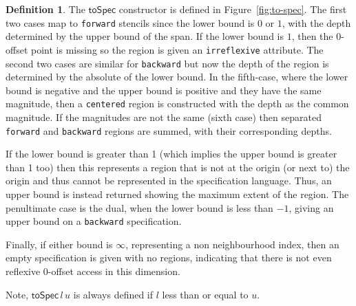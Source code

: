 \documentclass[9pt]{sigplanconf}
\newcounter{block}
\theoremstyle{definition}
\newtheorem{definition}[block]{Definition}
\begin{document}
\begin{definition} The $\mathsf{toSpec}$ constructor is defined
in Figure~\ref{fig:to-spec}.
The first two cases map to \texttt{forward} stencils since the lower
bound is $0$ or $1$, with the depth determined by the upper bound of
the span. If the lower bound is $1$, then the
$0$-offset point is missing so the region is given an
\texttt{irreflexive} attribute. The second two cases are similar for
\texttt{backward} but now the depth of the region is determined by the
absolute of the lower bound. In the fifth-case, where the lower bound
is negative and the upper bound is positive and they have the same
magnitude, then a \texttt{centered} region is constructed with
the depth as the common magnitude. If the magnitudes are not the same
(sixth case) then separated \texttt{forward} and \texttt{backward}
regions are summed, with their corresponding depths.

If the lower bound is greater than 1
(which implies the upper bound is greater than 1 too) then
this represents a region that is not at the origin (or next to) the
origin and thus cannot be represented in the specification language.
Thus, an upper bound is instead returned showing the maximum extent
of the region. The penultimate case is the dual, when the lower bound is less
than $-1$, giving an upper bound on a \texttt{backward} specification.

Finally, if either bound is $\infty$, representing a non
neighbourhood index, then an empty specification is given
 with no regions, indicating that there is not even reflexive
0-offset access in this dimension.

Note, $\mathsf{toSpec} \, l \, u$ is always defined 
 if $l$ less than or equal to $u$. 
\end{definition}
\end{document}

